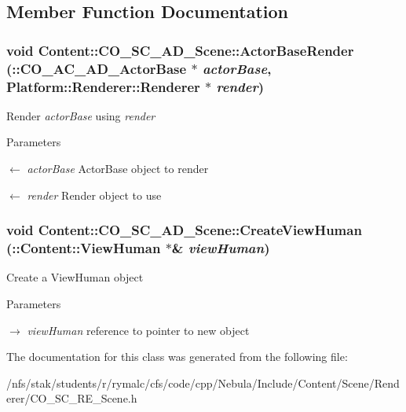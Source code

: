 \subsection{Member Function Documentation}
\hypertarget{classContent_1_1CO__SC__AD__Scene_ae463b7b590511a583097c5b37920d0ff}{
\subsubsection[{ActorBaseRender}]{\setlength{\rightskip}{0pt plus 5cm}void Content::CO\_\-SC\_\-AD\_\-Scene::ActorBaseRender (::{\bf CO\_\-AC\_\-AD\_\-ActorBase} $\ast$ {\em actorBase}, \/  {\bf Platform::Renderer::Renderer} $\ast$ {\em render})}}
\label{classContent_1_1CO__SC__AD__Scene_ae463b7b590511a583097c5b37920d0ff}
Render {\itshape actorBase\/} using {\itshape render\/} 
\begin{DoxyParams}{Parameters}
\item[\mbox{$\leftarrow$} {\em actorBase}]ActorBase object to render \item[\mbox{$\leftarrow$} {\em render}]Render object to use \end{DoxyParams}
\hypertarget{classContent_1_1CO__SC__AD__Scene_a62929f0e59b9b4617c2caa3079991300}{
\subsubsection[{CreateViewHuman}]{\setlength{\rightskip}{0pt plus 5cm}void Content::CO\_\-SC\_\-AD\_\-Scene::CreateViewHuman (::Content::ViewHuman $\ast$\& {\em viewHuman})}}
\label{classContent_1_1CO__SC__AD__Scene_a62929f0e59b9b4617c2caa3079991300}
Create a ViewHuman object 
\begin{DoxyParams}{Parameters}
\item[\mbox{$\rightarrow$} {\em viewHuman}]reference to pointer to new object \end{DoxyParams}


The documentation for this class was generated from the following file:\begin{DoxyCompactItemize}
\item 
/nfs/stak/students/r/rymalc/cfs/code/cpp/Nebula/Include/Content/Scene/Renderer/CO\_\-SC\_\-RE\_\-Scene.h\end{DoxyCompactItemize}
